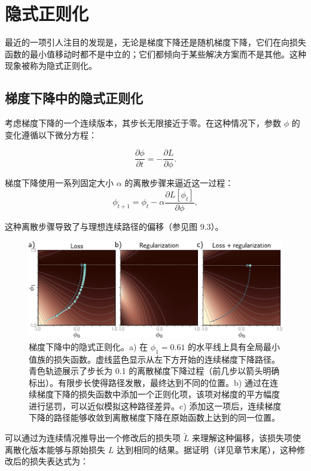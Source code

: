 \documentclass[lang=cn,newtx,10pt,scheme=chinese]{elegantbook}
\begin{document}
\section{隐式正则化}

最近的一项引人注目的发现是，无论是梯度下降还是随机梯度下降，它们在向损失函数的最小值移动时都不是中立的；它们都倾向于某些解决方案而不是其他。这种现象被称为隐式正则化。
\subsection{梯度下降中的隐式正则化}

考虑梯度下降的一个连续版本，其步长无限接近于零。在这种情况下，参数 \(\phi\) 的变化遵循以下微分方程：

\begin{equation}
\frac{\partial \phi}{\partial t} = -\frac{\partial L}{\partial \phi}. 
\end{equation}

梯度下降使用一系列固定大小 \(\alpha\) 的离散步骤来逼近这一过程：
\begin{equation}
\phi_{t+1} = \phi_t - \alpha \frac{\partial L[\phi_t]}{\partial \phi} , 
\end{equation}

这种离散步骤导致了与理想连续路径的偏移（参见图 9.3）。

\begin{figure}[ht!]
	\centering
	\includegraphics[width=0.7\linewidth]{PDFFigures/UDLChap9PDF/RegImplicit1.pdf}
	\caption{梯度下降中的隐式正则化。a) 在 \(\phi_1 = 0.61\) 的水平线上具有全局最小值族的损失函数。虚线蓝色显示从左下方开始的连续梯度下降路径。青色轨迹展示了步长为 0.1 的离散梯度下降过程（前几步以箭头明确标出）。有限步长使得路径发散，最终达到不同的位置。b) 通过在连续梯度下降的损失函数中添加一个正则化项，该项对梯度的平方幅度进行惩罚，可以近似模拟这种路径差异。c) 添加这一项后，连续梯度下降的路径能够收敛到离散梯度下降在原始函数上达到的同一位置。}
\end{figure}


可以通过为连续情况推导出一个修改后的损失项 \(\tilde{L}\) 来理解这种偏移，该损失项使离散化版本能够与原始损失 \(L\) 达到相同的结果。据证明（详见章节末尾），这种修改后的损失表达式为：
\end{document}
